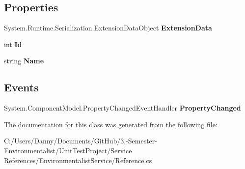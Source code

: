 \subsection*{Properties}
\begin{DoxyCompactItemize}
\item 
\hypertarget{class_unit_test_project_1_1_environmentalist_service_1_1_room_afa9d70e5ec1f262ad112bc26cd10a8dc}{}System.\+Runtime.\+Serialization.\+Extension\+Data\+Object {\bfseries Extension\+Data}\label{class_unit_test_project_1_1_environmentalist_service_1_1_room_afa9d70e5ec1f262ad112bc26cd10a8dc}

\item 
\hypertarget{class_unit_test_project_1_1_environmentalist_service_1_1_room_a938821f55826c22c34a073069b1a5092}{}int {\bfseries Id}\label{class_unit_test_project_1_1_environmentalist_service_1_1_room_a938821f55826c22c34a073069b1a5092}

\item 
\hypertarget{class_unit_test_project_1_1_environmentalist_service_1_1_room_a2b83a188b1226fe9930679210af0e50a}{}string {\bfseries Name}\label{class_unit_test_project_1_1_environmentalist_service_1_1_room_a2b83a188b1226fe9930679210af0e50a}

\end{DoxyCompactItemize}
\subsection*{Events}
\begin{DoxyCompactItemize}
\item 
\hypertarget{class_unit_test_project_1_1_environmentalist_service_1_1_room_ae4382fc1995a7f1d0cdbb37014589e5d}{}System.\+Component\+Model.\+Property\+Changed\+Event\+Handler {\bfseries Property\+Changed}\label{class_unit_test_project_1_1_environmentalist_service_1_1_room_ae4382fc1995a7f1d0cdbb37014589e5d}

\end{DoxyCompactItemize}


The documentation for this class was generated from the following file\+:\begin{DoxyCompactItemize}
\item 
C\+:/\+Users/\+Danny/\+Documents/\+Git\+Hub/3.-\/\+Semester-\/\+Environmentalist/\+Unit\+Test\+Project/\+Service References/\+Environmentalist\+Service/Reference.\+cs\end{DoxyCompactItemize}
